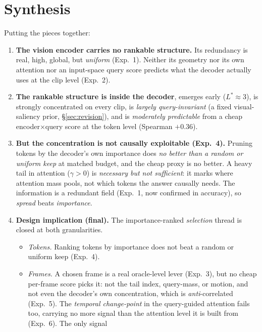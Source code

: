\documentclass[11pt]{article}
\newcommand{\gm}{\gamma}
\begin{document}
\section{Synthesis}

Putting the pieces together:
\begin{enumerate}
\item \textbf{The vision encoder carries no rankable structure.} Its redundancy is
      real, high, global, but \emph{uniform} (Exp.~1). Neither its geometry nor its
      own attention nor an input-space query score predicts what the decoder
      actually uses at the clip level (Exp.~2).
\item \textbf{The rankable structure is inside the decoder}, emerges early
      ($L^{\!*}\!\approx\!3$), is strongly concentrated on every clip, is
      \emph{largely query-invariant} (a fixed visual-saliency prior, \S\ref{sec:revision}),
      and is \emph{moderately predictable} from a cheap encoder$\times$query score at
      the token level (Spearman $+0.36$).
\item \textbf{But the concentration is not causally exploitable (Exp.~4).} Pruning
      tokens by the decoder's own importance does \emph{no better than a random or
      uniform keep} at matched budget, and the cheap proxy is no better. A heavy tail in
      attention ($\gm>0$) is \emph{necessary but not sufficient}: it marks where
      attention mass pools, not which tokens the answer causally needs. The information
      is a redundant field (Exp.~1, now confirmed in accuracy), so \emph{spread} beats
      \emph{importance}.
\item \textbf{Design implication (final).} The importance-ranked \emph{selection} thread is
      closed at both granularities.
      \begin{itemize}
      \item \emph{Tokens.} Ranking tokens by importance does not beat a random or uniform
            keep (Exp.~4).
      \item \emph{Frames.} A chosen frame is a real oracle-level lever (Exp.~3), but no cheap
            per-frame score picks it: not the tail index, query-mass, or motion, and not even
            the decoder's own concentration, which is \emph{anti}-correlated (Exp.~5). The
            \emph{temporal change-point} in the query-guided attention fails too, carrying no
            more signal than the attention level it is built from (Exp.~6). The only signal

\end{itemize}
\end{enumerate}
\end{document}
